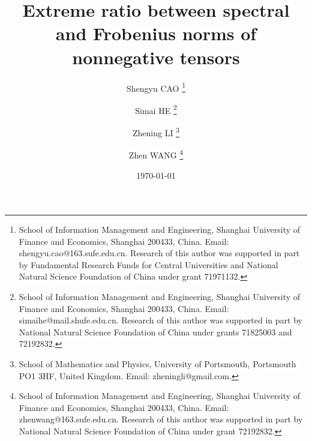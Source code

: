 \documentclass[11pt]{article}
\begin{document}
\title{Extreme ratio between spectral and Frobenius norms of nonnegative tensors}

\author{
Shengyu CAO
\thanks{School of Information Management and Engineering, Shanghai University of Finance and Economics, Shanghai 200433, China. Email: shengyu.cao@163.sufe.edu.cn. Research of this author was supported in part by Fundamental Research Funds for Central Universities and National Natural Science Foundation of China under grant 71971132.}
    \and
Simai HE
\thanks{School of Information Management and Engineering, Shanghai University of Finance and Economics, Shanghai 200433, China. Email: simaihe@mail.shufe.edu.cn. Research of this author was supported in part by National Natural Science Foundation of China under grants 71825003 and 72192832.}
    \and
Zhening LI
\thanks{School of Mathematics and Physics, University of Portsmouth, Portsmouth PO1 3HF, United Kingdom. Email: zheningli@gmail.com.}
    \and
Zhen WANG
\thanks{School of Information Management and Engineering, Shanghai University of Finance and Economics, Shanghai 200433, China. Email: zhenwang@163.sufe.edu.cn. Research of this author was supported in part by National Natural Science Foundation of China under grant 72192832.}
}

\date{\today}

\maketitle
\end{document}

